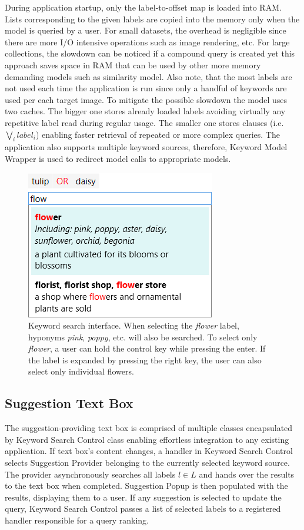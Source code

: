 During application startup, only the label-to-offset map is loaded into RAM. Lists corresponding to the given labels are copied into the memory only when the model is queried by a user. For small datasets, the overhead is negligible since there are more I/O intensive operations such as image rendering, etc. For large collections, the slowdown can be noticed if a compound query is created yet this approach saves space in RAM that can be used by other more memory demanding models such as similarity model. Also note, that the most labels are not used each time the application is run since only a handful of keywords are used per each target image. To mitigate the possible slowdown the model uses two caches. The bigger one stores already loaded labels avoiding virtually any repetitive label read during regular usage. The smaller one stores clauses (i.e. $\bigvee_i label_i$) enabling faster retrieval of repeated or more complex queries. The application also supports multiple keyword sources, therefore, Keyword Model Wrapper is used to redirect model calls to appropriate models.

\begin{figure}[ht]
	\centering
	\includegraphics[scale=0.5]{img/keyword-textbox.png}
	
	\caption[Keyword search interface]{Keyword search interface. When selecting the \textit{flower} label, hyponyms \textit{pink}, \textit{poppy}, etc. will also be searched. To select only \textit{flower}, a user can hold the control key while pressing the enter. If the label is expanded by pressing the right key, the user can also select only individual flowers.}
	\label{fig:keyword-textbox}
\end{figure}

\subsection{Suggestion Text Box}
The suggestion-providing text box is comprised of multiple classes encapsulated by Keyword Search Control class enabling effortless integration to any existing application. If text box's content changes, a handler in Keyword Search Control selects Suggestion Provider belonging to the currently selected keyword source. The provider asynchronously searches all labels $l\in L$ and hands over the results to the text box when completed. Suggestion Popup is then populated with the results, displaying them to a user. If any suggestion is selected to update the query, Keyword Search Control passes a list of selected labels to a registered handler responsible for a query ranking.


